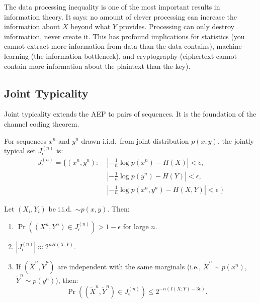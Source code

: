 The data processing inequality is one of the most important results in information theory. It says: no amount of clever processing can increase the information about $X$ beyond what $Y$ provides. Processing can only destroy information, never create it. This has profound implications for statistics (you cannot extract more information from data than the data contains), machine learning (the information bottleneck), and cryptography (ciphertext cannot contain more information about the plaintext than the key).

\subsection{Joint Typicality}
\label{sec:information:jointtypicality}

Joint typicality extends the AEP to pairs of sequences. It is the foundation of the channel coding theorem.

\begin{definition}
For sequences $x^n$ and $y^n$ drawn i.i.d.\ from joint distribution $p(x,y)$, the jointly typical set $J_\epsilon^{(n)}$ is:
\begin{equation*}
\begin{aligned}
J_\epsilon^{(n)} = \bigl\{ (x^n,y^n) : \;&
\left|-\frac{1}{n}\log p(x^n)-H(X)\right| < \epsilon, \\
&\left|-\frac{1}{n}\log p(y^n)-H(Y)\right| < \epsilon, \\
&\left|-\frac{1}{n}\log p(x^n,y^n)-H(X,Y)\right| < \epsilon \;\bigr\}
\end{aligned}
\end{equation*}
\end{definition}

\begin{theorem}
Let $(X_i,Y_i)$ be i.i.d.\ $\sim p(x,y)$. Then:
\begin{enumerate}
\item $\Pr((X^n,Y^n) \in J_\epsilon^{(n)}) > 1 - \epsilon$ for large $n$.
\item $|J_\epsilon^{(n)}| \approx 2^{nH(X,Y)}$.
\item If $(\tilde{X}^n,\tilde{Y}^n)$ are independent with the same marginals (i.e., $\tilde{X}^n\sim p(x^n)$, $\tilde{Y}^n\sim p(y^n)$), then:
\[
\Pr((\tilde{X}^n,\tilde{Y}^n) \in J_\epsilon^{(n)}) \le 2^{-n(I(X;Y)-3\epsilon)}.
\]
\end{enumerate}
\end{theorem}

